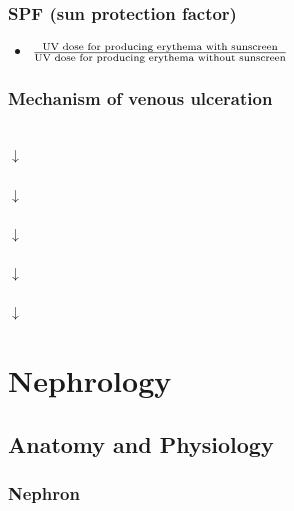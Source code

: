 \documentclass[
  12pt,
]{memoir}
\providecommand{\tightlist}{%
  \setlength{\itemsep}{0pt}\setlength{\parskip}{0pt}}
\begin{document}
\hypertarget{spf-sun-protection-factor}{%
\subsection{SPF (sun protection
factor)}\label{spf-sun-protection-factor}}

\begin{itemize}
\tightlist
\item
  \(\frac{\LARGE{\text{UV dose for producing erythema with sunscreen}}} {\LARGE{\text{UV dose for producing erythema without sunscreen}}}\)
\end{itemize}

\hypertarget{mechanism-of-venous-ulceration}{%
\subsection{Mechanism of venous
ulceration}\label{mechanism-of-venous-ulceration}}

\begin{center}
 \\
$\downarrow$ \\
 \\
$\downarrow$ \\
 \\
$\downarrow$ \\
 \\
$\downarrow$ \\
 \\
$\downarrow$ \\
\end{center}

\pagebreak

\hypertarget{nephrology}{%
\chapter{Nephrology}\label{nephrology}}

\hypertarget{anatomy-and-physiology-2}{%
\section{Anatomy and Physiology}\label{anatomy-and-physiology-2}}

\hypertarget{nephron}{%
\subsection{Nephron}\label{nephron}}
\end{document}
